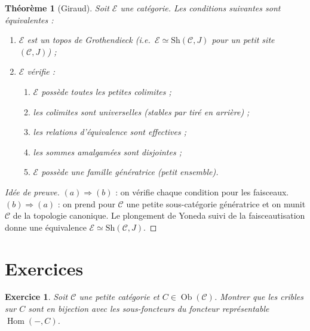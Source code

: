 \documentclass[a4paper,12pt]{book}
\DeclareMathOperator{\Hom}{Hom}
\DeclareMathOperator{\Ob}{Ob}
\newtheorem{theoreme}{Théorème}[chapter]
\newtheorem{exercice}{Exercice}[chapter]
\begin{document}
\begin{theoreme}[Giraud]\label{thm:giraud}
Soit $\mathcal{E}$ une catégorie.  Les conditions suivantes sont
équivalentes :
\begin{enumerate}[label=(\alph*)]
\item $\mathcal{E}$ est un topos de Grothendieck (i.e.\ $\mathcal{E}
      \simeq \mathrm{Sh}(\mathcal{C}, J)$ pour un petit site
      $(\mathcal{C}, J)$) ;
\item $\mathcal{E}$ vérifie :
  \begin{enumerate}[label=(\roman*)]
  \item $\mathcal{E}$ possède toutes les petites colimites ;
  \item les colimites sont universelles (stables par tiré en arrière) ;
  \item les relations d'équivalence sont effectives ;
  \item les sommes amalgamées sont disjointes ;
  \item $\mathcal{E}$ possède une famille génératrice (petit ensemble).
  \end{enumerate}
\end{enumerate}
\end{theoreme}

\begin{proof}[Idée de preuve]
$(a) \Rightarrow (b)$ : on vérifie chaque condition pour les faisceaux.
$(b) \Rightarrow (a)$ : on prend pour $\mathcal{C}$ une petite
sous-catégorie génératrice et on munit $\mathcal{C}$ de la topologie
canonique.  Le plongement de Yoneda suivi de la faisceautisation
donne une équivalence $\mathcal{E} \simeq \mathrm{Sh}(\mathcal{C}, J)$.
\end{proof}


\section{Exercices}\label{sec:exo-topos}

\begin{exercice}\label{exo:crible}
Soit $\mathcal{C}$ une petite catégorie et $C \in \Ob(\mathcal{C})$.
Montrer que les cribles sur $C$ sont en bijection avec les
sous-foncteurs du foncteur représentable $\Hom(-, C)$.
\end{exercice}
\end{document}
